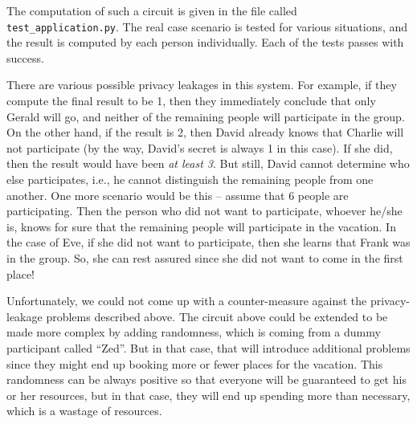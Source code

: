 \documentclass[9pt,conference]{IEEEtran}
\begin{document}
The computation of such a circuit is given in the file called \texttt{test\_application.py}. The real case scenario is tested for various situations, and the result is computed by each person individually. Each of the tests passes with success.

There are various possible privacy leakages in this system. For example, if they compute the final result to be 1, then they immediately conclude that only Gerald will go, and neither of the remaining people will participate in the group. On the other hand, if the result is 2, then David already knows that Charlie will not participate (by the way, David's secret is always 1 in this case). If she did, then the result would have been \textit{at least 3}. But still, David cannot determine who else participates, i.e., he cannot distinguish the remaining people from one another. One more scenario would be this -- assume that 6 people are participating. Then the person who did not want to participate, whoever he/she is, knows for sure that the remaining people will participate in the vacation. In the case of Eve, if she did not want to participate, then she learns that Frank was in the group. So, she can rest assured since she did not want to come in the first place!

Unfortunately, we could not come up with a counter-measure against the privacy-leakage problems described above. The circuit above could be extended to be made more complex by adding randomness, which is coming from a dummy participant  called ``Zed''. But in that case, that will introduce additional problems since they might end up booking more or fewer places for the vacation. This randomness can be always positive so that everyone will be guaranteed to get his or her resources, but in that case, they will end up spending more than necessary, which is a wastage of resources.
\end{document}
